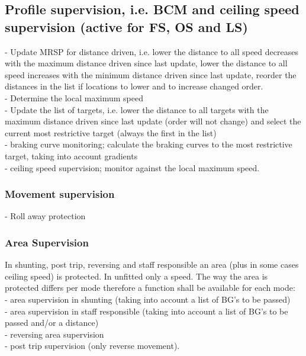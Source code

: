 \documentclass{template/openetcs_report}
\begin{document}
\subsection{Profile supervision, i.e. BCM and ceiling speed supervision (active for FS, OS and LS)}
- Update MRSP for distance driven, i.e. lower the distance to all speed decreases with the maximum distance driven since last update, lower the distance to all speed increases with the minimum distance driven since last update, reorder the distances in the list if locations to lower and to increase changed order.\\
- Determine the local maximum speed\\
- Update the list of targets, i.e. lower the distance to all targets with the maximum distance driven since last update (order will not change) and select the current most restrictive target (always the first in the list)\\
- braking curve monitoring; calculate the braking curves to the most restrictive target, taking into account gradients\\
- ceiling speed supervision; monitor against the local maximum speed.\\

\subsubsection{Movement supervision}
- Roll away protection\\

\subsubsection{Area Supervision}
In shunting, post trip, reversing and staff responsible an area (plus in some cases ceiling speed) is protected. In unfitted only a speed. The way the area is protected differs per mode therefore a function shall be available for each mode:\\
- area supervision in shunting (taking into account a list of \gls{BG}'s to be passed)\\
- area supervision in staff responsible (taking into account a list of \gls{BG}'s to be passed and/or a distance)\\
- reversing area supervision\\
- post trip supervision (only reverse movement).\\
\end{document}
